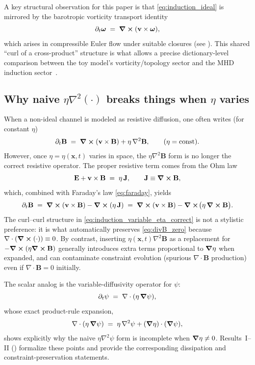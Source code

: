\documentclass[11pt]{article}
\theoremstyle{plain}
\theoremstyle{definition}
\theoremstyle{remark}
\newcommand{\diver}{\nabla\cdot}
\newcommand{\B}{\mathbf{B}}
\newcommand{\E}{\mathbf{E}}
\newcommand{\J}{\mathbf{J}}
\newcommand{\vfield}{\mathbf{v}}
\newcommand{\omegaV}{\boldsymbol{\omega}}
\begin{document}
A key structural observation for this paper is that \eqref{eq:induction_ideal} is mirrored by the
barotropic vorticity transport identity
\begin{equation}\label{eq:vorticity_ideal_struct}
  \partial_t \omegaV \;=\; \curl(\vfield\times\omegaV),
\end{equation}
which arises in compressible Euler flow under suitable closures (see ). This
shared ``curl of a cross-product'' structure is what allows a precise dictionary-level comparison
between the toy model's vorticity/topology sector and the MHD induction sector~\cite{Norris:Paper4}.

\subsection{Why naive $\eta\nabla^2(\cdot)$ breaks things when $\eta$ varies}\label{sec:background_variable_eta}
When a non-ideal channel is modeled as resistive diffusion, one often writes (for constant $\eta$)
\begin{equation}\label{eq:induction_resistive_constant_eta}
  \partial_t \B \;=\; \curl(\vfield\times\B) + \eta\,\nabla^2 \B,
  \qquad (\eta=\text{const}).
\end{equation}
However, once $\eta=\eta(\mathbf{x},t)$ varies in space, the $\eta\nabla^2\B$ form is no longer the
correct resistive operator. The proper resistive term comes from the Ohm law
\begin{equation}\label{eq:ohm_resistive}
  \E + \vfield\times\B \;=\; \eta\,\J,
  \qquad \J \equiv \curl\B,
\end{equation}
which, combined with Faraday's law \eqref{eq:faraday}, yields
\begin{equation}\label{eq:induction_variable_eta_correct}
  \partial_t \B \;=\; \curl(\vfield\times\B) - \curl(\eta\,\J)
  \;=\; \curl(\vfield\times\B) - \curl\!\big(\eta\,\curl\B\big).
\end{equation}
The curl--curl structure in \eqref{eq:induction_variable_eta_correct} is not a stylistic preference:
it is what automatically preserves \eqref{eq:divB_zero} because $\diver(\curl(\cdot))\equiv 0$. By
contrast, inserting $\eta(\mathbf{x},t)\nabla^2\B$ as a replacement for $-\curl(\eta\curl\B)$ generally
introduces extra terms proportional to $\grad\eta$ when expanded, and can contaminate constraint
evolution (spurious $\diver\B$ production) even if $\diver\B=0$ initially.

The scalar analog is the variable-diffusivity operator for $\psi$:
\begin{equation}\label{eq:scalar_variable_eta_background}
  \partial_t \psi \;=\; \diver(\eta\,\grad\psi),
\end{equation}
whose exact product-rule expansion,
\begin{equation}\label{eq:scalar_variable_eta_identity_background}
  \diver(\eta\,\grad\psi) \;=\; \eta\,\nabla^2\psi + (\grad\eta)\cdot(\grad\psi),
\end{equation}
shows explicitly why the naive $\eta\nabla^2\psi$ form is incomplete when $\grad\eta\neq 0$.
Results~I--II () formalize these points and provide the
corresponding dissipation and constraint-preservation statements.
\end{document}
